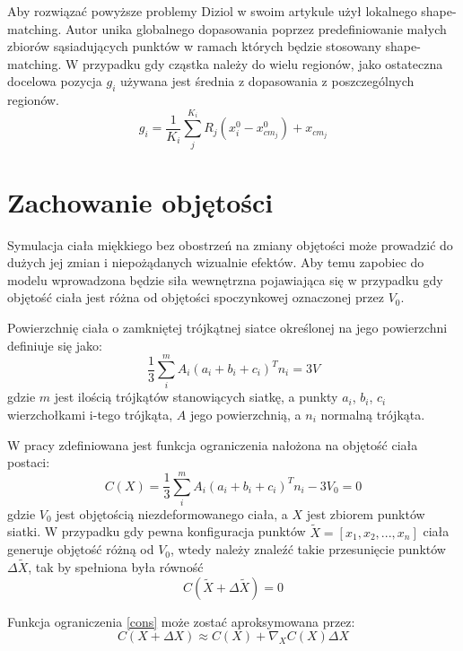 Aby rozwiązać powyższe problemy Diziol w swoim artykule \cite{diziol} użył
lokalnego shape-matching. Autor unika globalnego dopasowania poprzez
predefiniowanie małych zbiorów sąsiadujących punktów w ramach których będzie
stosowany shape-matching.  W przypadku gdy cząstka należy do wielu regionów,
		  jako ostateczna docelowa pozycja $g_i$ używana jest średnia z
		  dopasowania z poszczególnych regionów.
\begin{equation}
g_i = \frac{1}{K_i} \sum_j^{K_i} R_j (x^0_i - x^0_{cm_j}) + x_{cm_j}
\end{equation}

\section{Zachowanie objętości}
\label{sec:vol}
Symulacja ciała miękkiego bez obostrzeń na zmiany objętości może
prowadzić do dużych jej zmian i niepożądanych wizualnie efektów. 
Aby temu zapobiec do modelu wprowadzona będzie siła wewnętrzna pojawiająca się w
przypadku gdy objętość ciała jest różna od objętości spoczynkowej oznaczonej
przez $V_0$.

Powierzchnię ciała o zamkniętej trójkątnej siatce określonej na jego powierzchni definiuje
się jako: \cite{diziol}
\begin{equation}
\label{obj}
\frac{1}{3} \sum_i^m A_i (a_i + b_i + c_i)^T n_i = 3V
\end{equation}
gdzie $m$ jest ilością trójkątów stanowiących siatkę, a punkty $a_i$, $b_i$,
	  $c_i$ wierzchołkami i-tego trójkąta, $A$ jego powierzchnią, a $n_i$
	  normalną trójkąta.

W pracy \cite{diziol} zdefiniowana jest funkcja ograniczenia nałożona na
objętość ciała postaci:
\begin{equation}
\label{cons}
C(X) = \frac{1}{3} \sum_i^m A_i (a_i + b_i + c_i)^T n_i - 3V_0 = 0
\end{equation}
gdzie $V_0$ jest objętością niezdeformowanego ciała, a $X$ jest zbiorem punktów
siatki. W przypadku gdy pewna konfiguracja punktów $\tilde{X} = [x_1, x_2,...,
	x_n] $ ciała generuje
objętość różną od $V_0$, wtedy należy znaleźć takie przesunięcie punktów $\Delta
\tilde{X}$, tak by spełniona była równość 
$$C(\tilde{X} + \Delta \tilde{X}) = 0$$

Funkcja ograniczenia \ref{cons} może zostać aproksymowana przez:
\begin{equation}
\label{e1}
C(X + \Delta X) \approx C(X) + \nabla_X C(X) \Delta X
\end{equation}

